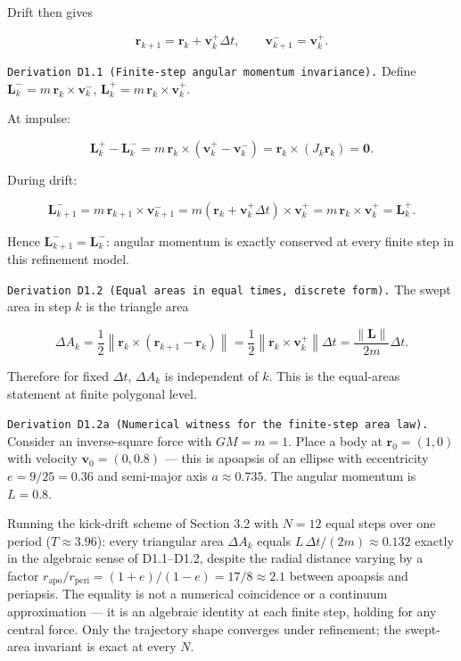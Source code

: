 \documentclass[
]{article}
\begin{document}
Drift then gives

\[
\mathbf r_{k+1}=\mathbf r_k+\mathbf v_k^{+}\Delta t,
\qquad
\mathbf v_{k+1}^{-}=\mathbf v_k^{+}.
\]

\texttt{Derivation\ D1.1\ (Finite-step\ angular\ momentum\ invariance).}
Define \(\mathbf L_k^{-}=m\,\mathbf r_k\times \mathbf v_k^{-}\),
\(\mathbf L_k^{+}=m\,\mathbf r_k\times \mathbf v_k^{+}\).

At impulse:

\[
\mathbf L_k^{+}-\mathbf L_k^{-}
=m\,\mathbf r_k\times(\mathbf v_k^{+}-\mathbf v_k^{-})
=\mathbf r_k\times (J_k\hat{\mathbf r}_k)=\mathbf 0.
\]

During drift:

\[
\mathbf L_{k+1}^{-}
=m\,\mathbf r_{k+1}\times \mathbf v_{k+1}^{-}
=m(\mathbf r_k+\mathbf v_k^{+}\Delta t)\times \mathbf v_k^{+}
=m\,\mathbf r_k\times \mathbf v_k^{+}
=\mathbf L_k^{+}.
\]

Hence \(\mathbf L_{k+1}^{-}=\mathbf L_k^{-}\): angular momentum is
exactly conserved at every finite step in this refinement model.

\texttt{Derivation\ D1.2\ (Equal\ areas\ in\ equal\ times,\ discrete\ form).}
The swept area in step \(k\) is the triangle area

\[
\Delta A_k
=\frac12\left\|\mathbf r_k\times(\mathbf r_{k+1}-\mathbf r_k)\right\|
=\frac12\left\|\mathbf r_k\times \mathbf v_k^{+}\right\|\Delta t
=\frac{\|\mathbf L\|}{2m}\Delta t.
\]

Therefore for fixed \(\Delta t\), \(\Delta A_k\) is independent of
\(k\). This is the equal-areas statement at finite polygonal level.

\texttt{Derivation\ D1.2a\ (Numerical\ witness\ for\ the\ finite-step\ area\ law).}
Consider an inverse-square force with \(GM=m=1\). Place a body at
\(\mathbf r_0=(1,0)\) with velocity \(\mathbf v_0=(0,0.8)\) --- this is
apoapsis of an ellipse with eccentricity \(e=9/25=0.36\) and semi-major
axis \(a\approx 0.735\). The angular momentum is \(L=0.8\).

Running the kick-drift scheme of Section 3.2 with \(N=12\) equal steps
over one period (\(T\approx 3.96\)): every triangular area
\(\Delta A_k\) equals \(L\,\Delta t/(2m)\approx 0.132\) exactly in the
algebraic sense of D1.1--D1.2, despite the radial distance varying by a
factor
\(r_{\mathrm{apo}}/r_{\mathrm{peri}}=(1+e)/(1-e)=17/8\approx 2.1\)
between apoapsis and periapsis. The equality is not a numerical
coincidence or a continuum approximation --- it is an algebraic identity
at each finite step, holding for any central force. Only the trajectory
shape converges under refinement; the swept-area invariant is exact at
every \(N\).
\end{document}
